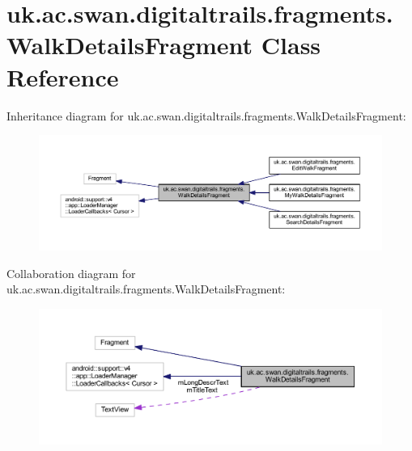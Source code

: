 \hypertarget{classuk_1_1ac_1_1swan_1_1digitaltrails_1_1fragments_1_1_walk_details_fragment}{\section{uk.\+ac.\+swan.\+digitaltrails.\+fragments.\+Walk\+Details\+Fragment Class Reference}
\label{classuk_1_1ac_1_1swan_1_1digitaltrails_1_1fragments_1_1_walk_details_fragment}
}


Inheritance diagram for uk.\+ac.\+swan.\+digitaltrails.\+fragments.\+Walk\+Details\+Fragment\+:\nopagebreak
\begin{figure}[H]
\begin{center}
\leavevmode
\includegraphics[width=350pt]{classuk_1_1ac_1_1swan_1_1digitaltrails_1_1fragments_1_1_walk_details_fragment__inherit__graph}
\end{center}
\end{figure}


Collaboration diagram for uk.\+ac.\+swan.\+digitaltrails.\+fragments.\+Walk\+Details\+Fragment\+:\nopagebreak
\begin{figure}[H]
\begin{center}
\leavevmode
\includegraphics[width=350pt]{classuk_1_1ac_1_1swan_1_1digitaltrails_1_1fragments_1_1_walk_details_fragment__coll__graph}
\end{center}
\end{figure}
